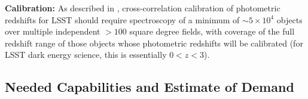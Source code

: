 {\bf Calibration:} As described in \citet{Newman15},  cross-correlation calibration of photometric redshifts for LSST should require spectroscopy of a minimum of $\sim 5 \times 10^4$ objects over multiple independent $>100$ square degree fields, with coverage of the full redshift range of those objects whose photometric redshifts will be calibrated (for LSST dark energy science, this is essentially $0<z<3$).



\subsection{Needed Capabilities and Estimate of Demand}


